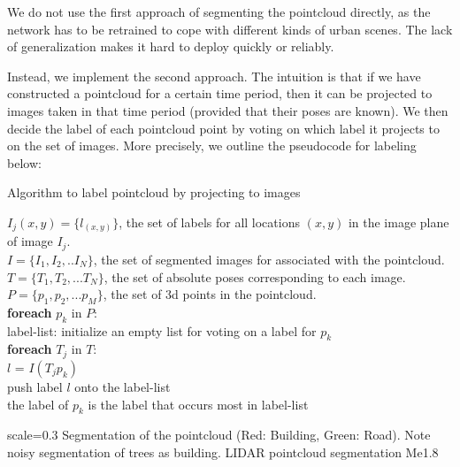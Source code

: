 We do not use the first approach of segmenting the pointcloud directly, as the network has to be retrained to cope with different kinds of urban scenes. The lack of generalization makes it hard to deploy quickly or reliably. 

Instead, we implement the second approach. The intuition is that if we have constructed a pointcloud for a certain time period, then it can be projected to images taken in that time period (provided that their poses are known). We then decide the label of each pointcloud point by voting on which label it projects to on the set of images. More precisely, we outline the pseudocode for labeling below:

\begin{algorithm}
\caption{Algorithm to label pointcloud by projecting to images}
\begin{algorithmic}
\REQUIRE $I_j(x,y) = \{l_{(x,y)}\}$, the set of labels for all locations $(x,y)$ in the image plane of image $I_j$.\\
$I = \{I_1, I_2,..I_N\}$, the set of segmented images for associated with the pointcloud.\\
$T = \{T_1, T_2,...T_N\}$, the set of absolute poses corresponding to each image.\\
$P = \{p_1, p_2, ...p_M\}$, the set of 3d points in the pointcloud. \\
\vspace{5 mm}
\textbf{foreach} $p_k$ in $P$:\\
   
   \hspace{5 mm} label-list: initialize an empty list for voting on a label for $p_k$\\
    \hspace{5 mm}\textbf{foreach} $T_j$ in $T$:\\
      \hspace{5 mm}\hspace{5 mm}$l$ = $I(T_j p_k)$\\
      \hspace{5 mm}\hspace{5 mm}push label $l$ onto the label-list\\
the label of $p_k$ is the label that occurs most in label-list\\
\end{algorithmic}
\end{algorithm}

{scale=0.3}%
{Segmentation of the pointcloud (Red: Building, Green: Road). Note noisy segmentation of trees as building.}%
{LIDAR pointcloud segmentation}%
{Me1.8}

